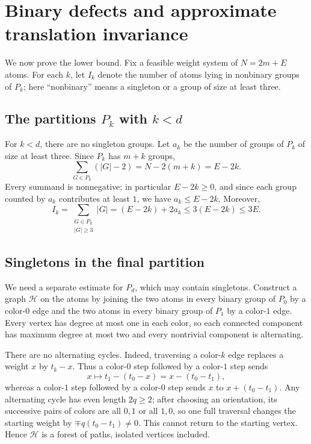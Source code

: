 \documentclass[11pt]{article}
\theoremstyle{definition}
\newcommand{\1}{\mathbf{1}}
\begin{document}
\section{Binary defects and approximate translation invariance}

We now prove the lower bound.  Fix a feasible weight system of $N=2m+E$ atoms.
For each $k$, let $I_k$ denote the number of atoms lying in nonbinary groups of $P_k$; here ``nonbinary'' means a singleton or a group of size at least three.

\subsection{The partitions $P_k$ with $k<d$}

For $k<d$, there are no singleton groups.  Let $a_k$ be the number of groups of $P_k$ of size at least three.  Since $P_k$ has $m+k$ groups,
\begin{equation}\label{eq:deviation-k}
  \sum_{G\in P_k}(|G|-2)
  =N-2(m+k)=E-2k.
\end{equation}
Every summand is nonnegative; in particular $E-2k\ge0$, and since each group counted by $a_k$ contributes at least $1$, we have $a_k\le E-2k$.  Moreover,
\begin{equation}\label{eq:Ik-small}
  I_k
  =\sum_{\substack{G\in P_k\\|G|\ge3}}|G|
  =(E-2k)+2a_k
  \le3(E-2k)\le3E.
\end{equation}

\subsection{Singletons in the final partition}

We need a separate estimate for $P_d$, which may contain singletons.  Construct a graph $\mathcal H$ on the atoms by joining the two atoms in every binary group of $P_0$ by a color-$0$ edge and the two atoms in every binary group of $P_1$ by a color-$1$ edge.  Every vertex has degree at most one in each color, so each connected component has maximum degree at most two and every nontrivial component is alternating.

There are no alternating cycles.  Indeed, traversing a color-$k$ edge replaces a weight $x$ by $t_k-x$.  Thus a color-$0$ step followed by a color-$1$ step sends
\[
  x\longmapsto t_1-(t_0-x)=x-(t_0-t_1),
\]
whereas a color-$1$ step followed by a color-$0$ step sends $x$ to $x+(t_0-t_1)$.  Any alternating cycle has even length $2q\ge2$; after choosing an orientation, its successive pairs of colors are all $0,1$ or all $1,0$, so one full traversal changes the starting weight by $\mp q(t_0-t_1)\ne0$.  This cannot return to the starting vertex.  Hence $\mathcal H$ is a forest of paths, isolated vertices included.
\end{document}
